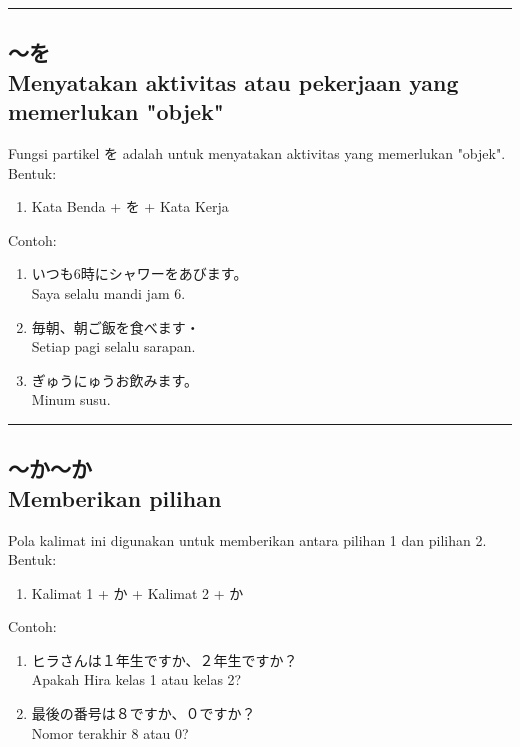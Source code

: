 \vspace{0.2cm}\hrule height 1pt\vspace{0.2cm}


\subsection*{
    ～を \\
    Menyatakan aktivitas atau pekerjaan yang memerlukan "objek"
}
Fungsi partikel を adalah untuk menyatakan aktivitas yang memerlukan 
"objek".\\
Bentuk:
\begin{enumerate}
    \item Kata Benda + を + Kata Kerja
\end{enumerate}
Contoh: 
\begin{enumerate}
    \item いつも6時にシャワーをあびます。
    \\ Saya selalu mandi jam 6.
    \item 毎朝、朝ご飯を食べます・
    \\ Setiap pagi selalu sarapan.
    \item ぎゅうにゅうお飲みます。
    \\ Minum susu.
\end{enumerate}

\vspace{0.2cm}\hrule height 1pt\vspace{0.2cm}

\newpage
\subsection*{
    ～か～か \\
    Memberikan pilihan
}
Pola kalimat ini digunakan untuk memberikan antara pilihan 1 
dan pilihan 2.\\
Bentuk:
\begin{enumerate}
    \item Kalimat 1 + か + Kalimat 2 + か
\end{enumerate}
Contoh: 
\begin{enumerate}
    \item ヒラさんは１年生ですか、２年生ですか？
    \\ Apakah Hira kelas 1 atau kelas 2?
    \item 最後の番号は８ですか、０ですか？
    \\ Nomor terakhir 8 atau 0?
\end{enumerate}

